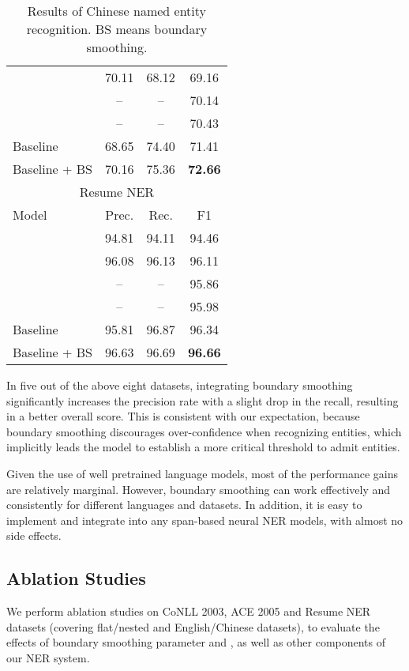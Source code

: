 \documentclass[11pt]{article}
\begin{document}
\begin{table}[!ht]
\begin{tabular}{lccc}
        \citet{shen-etal-2021-locate}   & 70.11 & 68.12 & 69.16 \\
        \citet{chen-kong-2021-enhancing} & -- & -- & 70.14 \\
        \citet{wu-etal-2021-mect}       & -- & -- & 70.43 \\
        Baseline          & 68.65 & 74.40 & 71.41 \\
        Baseline + BS     & 70.16 & 75.36 & \textbf{72.66} \\
        \bottomrule
        \toprule
        \multicolumn{4}{c}{Resume NER} \\
        \midrule
        Model & Prec. & Rec. & F1 \\
        \midrule
        \citet{zhang-yang-2018-chinese} & 94.81 & 94.11 & 94.46 \\
        \citet{ma-etal-2020-simplify}   & 96.08 & 96.13 & 96.11 \\
        \citet{li-etal-2020-flat}       & -- & -- & 95.86 \\
        \citet{wu-etal-2021-mect}       & -- & -- & 95.98 \\
        Baseline          & 95.81 & 96.87 & 96.34 \\
        Baseline + BS     & 96.63 & 96.69 & \textbf{96.66} \\
        \bottomrule
    \end{tabular}
    \caption{Results of Chinese named entity recognition. BS means boundary smoothing.}
    \label{tab:chinese-res}
\end{table}


In five out of the above eight datasets, integrating boundary smoothing significantly increases the precision rate with a slight drop in the recall, resulting in a better overall  score. This is consistent with our expectation, because boundary smoothing discourages over-confidence when recognizing entities, which implicitly leads the model to establish a more critical threshold to admit entities. 

Given the use of well pretrained language models, most of the performance gains are relatively marginal. However, boundary smoothing can work effectively and consistently for different languages and datasets. In addition, it is easy to implement and integrate into any span-based neural NER models, with almost no side effects. 


\subsection{Ablation Studies}
We perform ablation studies on CoNLL 2003, ACE 2005 and Resume NER datasets (covering flat/nested and English/Chinese datasets), to evaluate the effects of boundary smoothing parameter  and , as well as other components of our NER system. 
\end{document}
